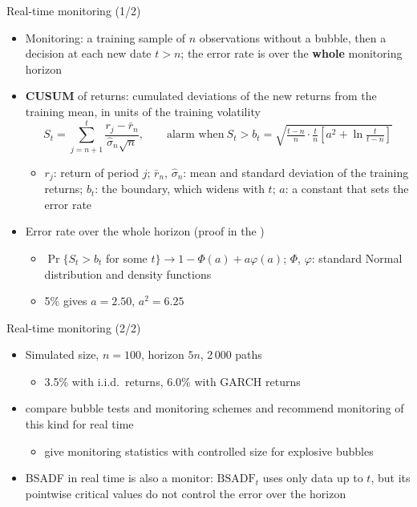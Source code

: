 \begin{frame}{Real-time monitoring (1/2)}
\itemsize{\small}
\begin{itemize}
    \item Monitoring: a training sample of $n$ observations without a bubble, then a decision at each new date $t > n$; the error rate is over the \textbf{whole} monitoring horizon 
    \item \textbf{CUSUM} of returns: cumulated deviations of the new returns from the training mean, in units of the training volatility \[ S_t = \sum_{j=n+1}^{t}\frac{r_j - \bar r_n}{\hat\sigma_n\sqrt n}, \qquad \text{alarm when}\ S_t > b_t = \sqrt{\tfrac{t - n}{n}\cdot\tfrac{t}{n}\left[a^2 + \ln\tfrac{t}{t - n}\right]} \]
    \begin{itemize}
        \item $r_j$: return of period $j$; $\bar r_n$, $\hat\sigma_n$: mean and standard deviation of the training returns; $b_t$: the boundary, which widens with $t$; $a$: a constant that sets the error rate
    \end{itemize}
    \item Error rate over the whole horizon (proof in the )
    \begin{itemize}
        \item $\Pr\{S_t > b_t$ for some $t\} \to 1 - \Phi(a) + a\varphi(a)$; $\Phi$, $\varphi$: standard Normal distribution and density functions
        \item 5\% gives $a = 2.50$, $a^2 = 6.25$
    \end{itemize}
\end{itemize}
\end{frame}

\begin{frame}{Real-time monitoring (2/2)}
\itemsize{\small}
\begin{itemize}
    \item Simulated size, $n = 100$, horizon $5n$, 2\,000 paths
    \begin{itemize}
        \item 3.5\% with i.i.d.\ returns, 6.0\% with GARCH returns
    \end{itemize}
    \item {} compare bubble tests and monitoring schemes and recommend monitoring of this kind for real time
    \begin{itemize}
        \item {} give monitoring statistics with controlled size for explosive bubbles
    \end{itemize}
    \item BSADF in real time is also a monitor: $\mathrm{BSADF}_t$ uses only data up to $t$, but its pointwise critical values do not control the error over the horizon
\end{itemize}
\end{frame}

